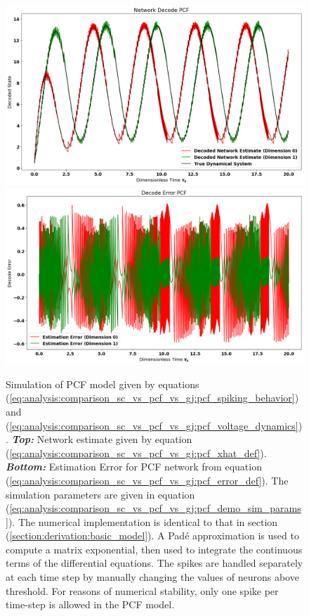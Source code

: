 \begin{enumerate}
\begin{figure}
\centering
\includegraphics[width=\linewidth]{figures/network_decode_PCF.png}
\includegraphics[width=\linewidth]{figures/decode_error_PCF.png}
\caption{Simulation of PCF model given by equations (\ref{eq:analysis:comparison_sc_vs_pcf_vs_gj:pcf_spiking_behavior}) and (\ref{eq:analysis:comparison_sc_vs_pcf_vs_gj:pcf_voltage_dynamics}). \textbf{\textit{Top:}} Network estimate given by equation (\ref{eq:analysis:comparison_sc_vs_pcf_vs_gj:pcf_xhat_def}). \textbf{\textit{Bottom:}} Estimation Error for PCF network from equation (\ref{eq:analysis:comparison_sc_vs_pcf_vs_gj:pcf_error_def}). The simulation parameters are given in equation (\ref{eq:analysis:comparison_sc_vs_pcf_vs_gj:pcf_demo_sim_params}). The numerical implementation is identical to that in section (\ref{section:derivation:basic_model}). A Pad\'e approximation is used to compute a matrix exponential, then used to integrate the continuous terms of the differential equations. The spikes are handled separately at each time step by manually changing the values of neurons above threshold.  For reasons of numerical stability, only one spike per time-step is allowed in the PCF model.  
}
\label{fig:analysis:comparison_sc_vs_pcf_vs_gj:pcf_network_decode_demo}
\end{figure}


\end{enumerate}
